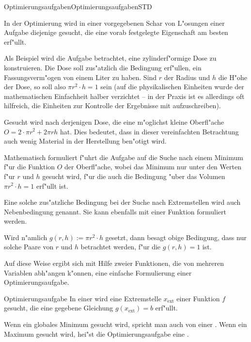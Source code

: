 \begin{MXContent}{Optimierungsaufgaben}{Optimierungsaufgaben}{STD}

In der Optimierung wird in einer vorgegebenen Schar von L"osungen einer 
Aufgabe diejenige gesucht, die eine vorab festgelegte Eigenschaft am besten 
erf"ullt.

Als Beispiel wird die Aufgabe betrachtet, eine zylinderf"ormige Dose zu 
konstruieren. Die Dose soll zus"atzlich die Bedingung erf"ullen, ein 
Fassungsverm"ogen von einem Liter zu haben. Sind $r$ der Radius und $h$ die
H"ohe der Dose, so soll also $\pi r^2 \cdot h = 1$ sein (auf die physikalischen
Einheiten wurde der mathematischen Einfachheit halber verzichtet -- in der 
Praxis ist es allerdings oft hilfreich, die Einheiten 
zur Kontrolle der Ergebnisse mit aufzuschreiben). 

Gesucht wird nach derjenigen Dose, die eine m"oglichst kleine Oberfl"ache 
$O = 2 \cdot \pi r^2 + 2 \pi r h$ hat. Dies bedeutet, dass in 
dieser vereinfachten Betrachtung auch wenig Material in der Herstellung 
ben"otigt wird.

Mathematisch formuliert f"uhrt die Aufgabe auf die Suche nach einem 
Minimum f"ur die Funktion $O$ der Oberfl"ache, wobei das Minimum nur 
unter den Werten f"ur $r$ und $h$ gesucht wird, f"ur die auch die Bedingung 
"uber das Volumen $\pi r^2 \cdot h = 1$ erf"ullt ist.

Eine solche zus"atzliche Bedingung bei der Suche nach Extremstellen wird 
auch Nebenbedingung genannt. Sie kann ebenfalls mit einer Funktion 
formuliert werden.

Wird n"amlich $g(r, h) := \pi r^2 \cdot h$ gesetzt, dann besagt obige 
Bedingung, dass nur solche Paare von $r$ und $h$ betrachtet werden, f"ur die 
$g(r, h) = 1$ ist.

Auf diese Weise ergibt sich mit Hilfe zweier Funktionen, die von mehreren
Variablen abh"angen k"onnen, eine einfache Formulierung einer 
Optimierungsaufgabe. 

\begin{MXInfo}{Optimierungsaufgabe}
In einer  wird eine
Extremstelle $x_{\text{ext}}$ einer Funktion $f$ gesucht, die eine 
gegebene Gleichung $g(x_{\text{ext}}) = b$ erf"ullt.

Wenn ein globales Minimum gesucht wird, spricht man auch von einer 
. Wenn ein Maximum gesucht
wird, hei"st die Optimierungsaufgabe eine 
.


\end{MXInfo}
\end{MXContent}
